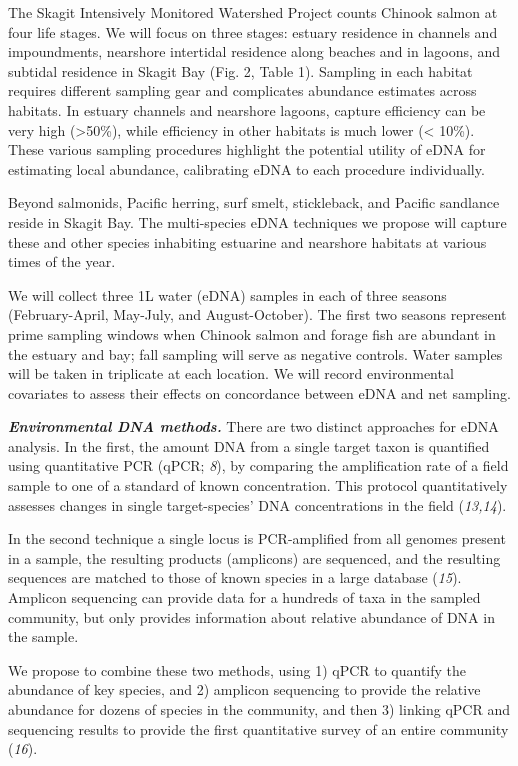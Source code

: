 \documentclass[]{article}
\begin{document}
The Skagit Intensively Monitored Watershed Project counts Chinook salmon
at four life stages. We will focus on three stages: estuary residence in
channels and impoundments, nearshore intertidal residence along beaches
and in lagoons, and subtidal residence in Skagit Bay (Fig. 2, Table 1).
Sampling in each habitat requires different sampling gear and
complicates abundance estimates across habitats. In estuary channels and
nearshore lagoons, capture efficiency can be very high
(\textgreater{}50\%), while efficiency in other habitats is much lower
(\textless{} 10\%). These various sampling procedures highlight the
potential utility of eDNA for estimating local abundance, calibrating
eDNA to each procedure individually.{~}

Beyond salmonids, Pacific herring, surf smelt, stickleback, and Pacific
sandlance reside in Skagit Bay. The multi-species eDNA techniques we
propose will capture these and other species inhabiting estuarine and
nearshore habitats at various times of the year.

We will collect three 1L water (eDNA) samples in each of three seasons
(February-April, May-July, and August-October). The first two seasons
represent prime sampling windows when Chinook salmon and forage fish are
abundant in the estuary and bay; fall sampling will serve as negative
controls. Water samples will be taken in triplicate at each location. We
will record environmental covariates to assess their effects on
concordance between eDNA and net sampling.

\textbf{\emph{Environmental DNA methods.}} There are two distinct
approaches for eDNA analysis. In the first, the amount DNA from a single
target taxon is quantified using quantitative PCR (qPCR; \emph{8}), by
comparing the amplification rate of a field sample to one of a standard
of known concentration. This protocol quantitatively assesses changes in
single target-species' DNA concentrations in the field (\emph{13,14}).

In the second technique a single locus is PCR-amplified from all genomes
present in a sample, the resulting products (amplicons) are sequenced,
and the resulting sequences are matched to those of known species in a
large database (\emph{15}). Amplicon sequencing can provide data for a
hundreds of taxa in the sampled community, but only provides information
about relative abundance of DNA in the sample.{~}

We propose to combine these two methods, using 1) qPCR to quantify the
abundance of key species, and 2) amplicon sequencing to provide the
relative abundance for dozens of species in the community, and then 3)
linking qPCR and sequencing results to provide the first quantitative
survey of an entire community (\emph{16}).
\end{document}
